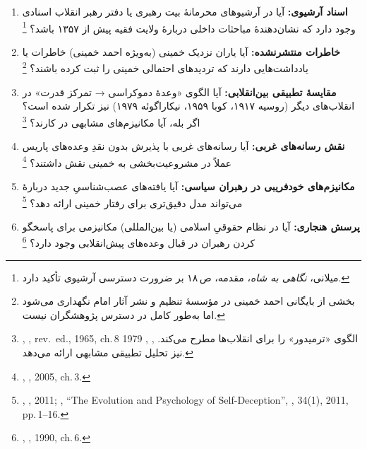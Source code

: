 \begin{enumerate}
\item \textbf{اسناد آرشیوی:}
  آیا در آرشیوهای محرمانهٔ بیت رهبری یا دفتر رهبر انقلاب
  اسنادی وجود دارد که نشان‌دهندهٔ مباحثات داخلی
  دربارهٔ ولایت فقیه پیش از ۱۳۵۷ باشد؟%
  \footnote{میلانی، \textit{نگاهی به شاه}، مقدمه، ص\,۱۸
  بر ضرورت دسترسی آرشیوی تأکید دارد.}

\item \textbf{خاطرات منتشرنشده:}
  آیا یاران نزدیک خمینی
  (به‌ویژه احمد خمینی)
  خاطرات یا یادداشت‌هایی دارند که
  تردیدهای احتمالی خمینی را ثبت کرده باشند؟%
  \footnote{بخشی از بایگانی احمد خمینی
  در مؤسسهٔ تنظیم و نشر آثار امام نگهداری می‌شود
  اما به‌طور کامل در دسترس پژوهشگران نیست.}

\item \textbf{مقایسهٔ تطبیقی بین‌انقلابی:}
  آیا الگوی «وعدهٔ دموکراسی → تمرکز قدرت»
  در انقلاب‌های دیگر
  (روسیه ۱۹۱۷، کوبا ۱۹۵۹، نیکاراگوئه ۱۹۷۹)
  نیز تکرار شده است؟
  اگر بله، آیا مکانیزم‌های مشابهی در کارند؟%
  \footnote{%
  ,
  \textit{}, rev.\ ed., 1965, ch.\,8
  الگوی «ترمیدور» را برای انقلاب‌ها مطرح می‌کند.
  ,
  \textit{}, 1979
  نیز تحلیل تطبیقی مشابهی ارائه می‌دهد.}

\item \textbf{نقش رسانه‌های غربی:}
  آیا رسانه‌های غربی با پذیرش بدون نقدِ وعده‌های پاریس
  عملاً در مشروعیت‌بخشی به خمینی نقش داشتند؟%
  \footnote{%
  ,
  \textit{},
  2005, ch.\,3.}

\item \textbf{مکانیزم‌های خودفریبی در رهبران سیاسی:}
  آیا یافته‌های عصب‌شناسیِ جدید دربارهٔ
  می‌تواند مدل دقیق‌تری برای رفتار خمینی ارائه دهد؟%
  \footnote{%
  ,
  \textit{}, 2011;
  ,
  ``The Evolution and Psychology of Self-Deception'',
  \textit{}, 34(1), 2011, pp.\,1–16.}

\item \textbf{پرسش هنجاری:}
  آیا در نظام حقوقیِ اسلامی (یا بین‌المللی)
  مکانیزمی برای پاسخگو کردن رهبران
  در قبال وعده‌های پیش‌انقلابی وجود دارد؟%
  \footnote{%
  ,
  \textit{}, 1990, ch.\,6.}
\end{enumerate}

